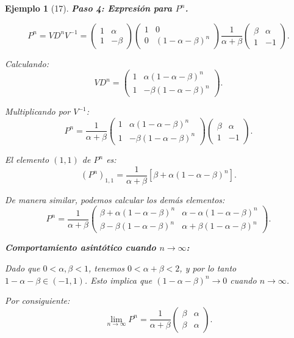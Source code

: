 \documentclass[12pt]{book}
\newtheorem{example}{Ejemplo}[chapter]
\begin{document}
\begin{example}[17]
\textbf{Paso 4: Expresión para $P^n$.}

\[
P^n = V D^n V^{-1} = \begin{pmatrix} 1 & \alpha \\ 1 & -\beta \end{pmatrix} \begin{pmatrix} 1 & 0 \\ 0 & (1-\alpha-\beta)^n \end{pmatrix} \frac{1}{\alpha + \beta} \begin{pmatrix} \beta & \alpha \\ 1 & -1 \end{pmatrix}.
\]

Calculando:
\[
V D^n = \begin{pmatrix} 1 & \alpha(1-\alpha-\beta)^n \\ 1 & -\beta(1-\alpha-\beta)^n \end{pmatrix}.
\]

Multiplicando por $V^{-1}$:
\[
P^n = \frac{1}{\alpha + \beta} \begin{pmatrix} 1 & \alpha(1-\alpha-\beta)^n \\ 1 & -\beta(1-\alpha-\beta)^n \end{pmatrix} \begin{pmatrix} \beta & \alpha \\ 1 & -1 \end{pmatrix}.
\]

El elemento $(1,1)$ de $P^n$ es:
\[
(P^n)_{1,1} = \frac{1}{\alpha + \beta} \left[ \beta + \alpha(1-\alpha-\beta)^n \right].
\]

De manera similar, podemos calcular los demás elementos:
\[
\boxed{P^n = \frac{1}{\alpha + \beta} \begin{pmatrix} 
\beta + \alpha(1-\alpha-\beta)^n & \alpha - \alpha(1-\alpha-\beta)^n \\
\beta - \beta(1-\alpha-\beta)^n & \alpha + \beta(1-\alpha-\beta)^n
\end{pmatrix}.}
\]

\textbf{Comportamiento asintótico cuando $n \to \infty$:}

Dado que $0 < \alpha, \beta < 1$, tenemos $0 < \alpha + \beta < 2$, y por lo tanto $1 - \alpha - \beta \in (-1, 1)$. Esto implica que $(1 - \alpha - \beta)^n \to 0$ cuando $n \to \infty$.

Por consiguiente:
\[
\lim_{n \to \infty} P^n = \frac{1}{\alpha + \beta} \begin{pmatrix} 
\beta & \alpha \\
\beta & \alpha
\end{pmatrix}.
\]


\end{example}
\end{document}
